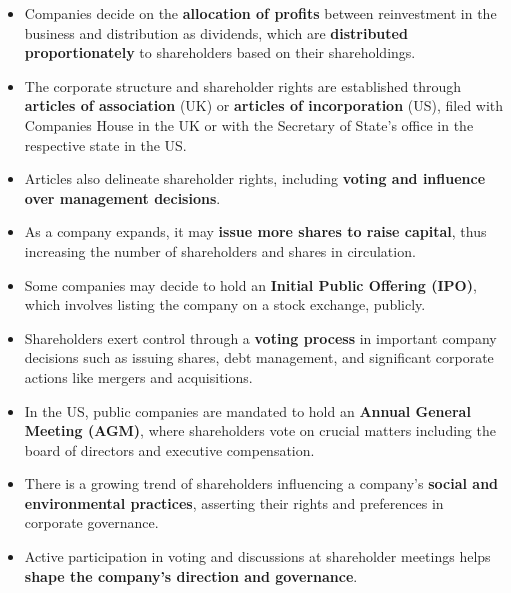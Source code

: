 \begin{itemize}
    \item Companies decide on the \textbf{allocation of profits} between reinvestment in the business and distribution as dividends, which are \textbf{distributed proportionately} to shareholders based on their shareholdings.
    \item The corporate structure and shareholder rights are established through \textbf{articles of association} (UK) or \textbf{articles of incorporation} (US), filed with Companies House in the UK or with the Secretary of State's office in the respective state in the US.
    \item Articles also delineate shareholder rights, including \textbf{voting and influence over management decisions}.
    \item As a company expands, it may \textbf{issue more shares to raise capital}, thus increasing the number of shareholders and shares in circulation.
    \item Some companies may decide to hold an \textbf{Initial Public Offering (IPO)}, which involves listing the company on a stock exchange, publicly.
    \item Shareholders exert control through a \textbf{voting process} in important company decisions such as issuing shares, debt management, and significant corporate actions like mergers and acquisitions.
    \item In the US, public companies are mandated to hold an \textbf{Annual General Meeting (AGM)}, where shareholders vote on crucial matters including the board of directors and executive compensation.
    \item There is a growing trend of shareholders influencing a company's \textbf{social and environmental practices}, asserting their rights and preferences in corporate governance.
    \item Active participation in voting and discussions at shareholder meetings helps \textbf{shape the company's direction and governance}.
\end{itemize}

